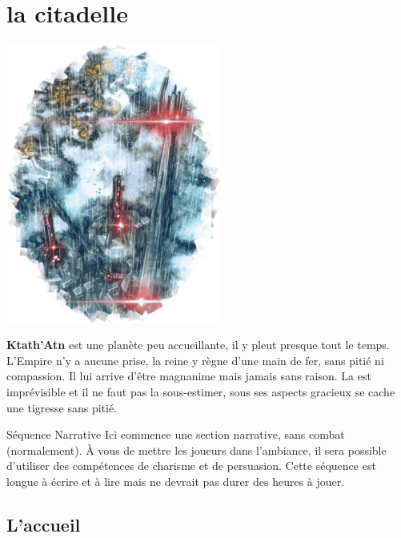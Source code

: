 \section{la citadelle}

\includegraphics[width=200pt]{_img/places/citadel-of-ktath-atn.png}

\textbf{Ktath’Atn} est une planète peu accueillante, il y pleut presque tout le temps. L’Empire n’y a aucune prise, la reine y règne d’une main de fer, sans pitié ni compassion. Il lui arrive d’être magnanime mais jamais sans raison. La  est imprévisible et il ne faut pas la sous-estimer, sous ses aspects gracieux se cache une tigresse sans pitié.

\begin{paperbox}{Séquence Narrative}
Ici commence une section narrative, sans combat (normalement). À vous de mettre les joueurs dans l’ambiance, il sera possible d’utiliser des compétences de charisme et de persuasion. Cette séquence est longue à écrire et à lire mais ne devrait pas durer des heures à jouer.
\end{paperbox}

\subsection{L’accueil}

